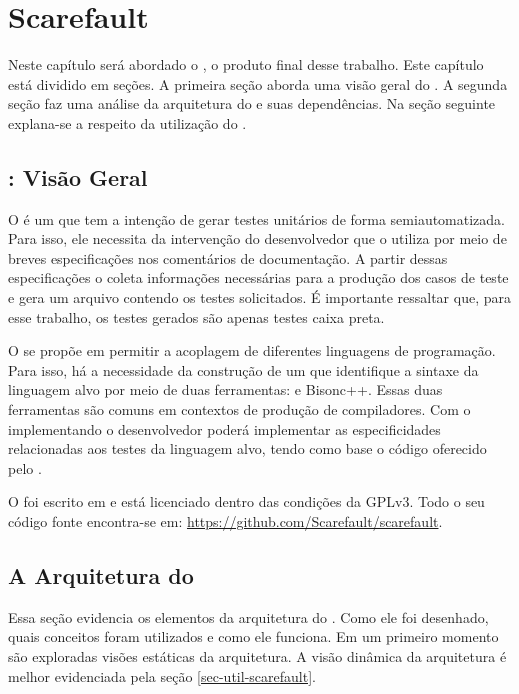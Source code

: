 \chapter[Scarefault]{Scarefault}
Neste capítulo será abordado o \Scarefault, o produto final desse
trabalho. Este capítulo está dividido em seções. A primeira seção aborda
uma visão geral do \Scarefault. A segunda seção faz uma análise da
arquitetura do \framework e suas dependências. Na seção seguinte explana-se
a respeito da utilização do \Scarefault.

\section{\Scarefault: Visão Geral}
O \scarefault é um \framework que tem a intenção de gerar testes unitários
de forma semiautomatizada. Para isso, ele necessita da intervenção do
desenvolvedor que o utiliza por meio de breves especificações nos
comentários de documentação. A partir dessas especificações o \scarefault
coleta informações necessárias para a produção dos casos de teste e gera
um arquivo contendo os testes solicitados. É importante ressaltar que,
para esse trabalho, os testes gerados são apenas testes caixa preta.

O \framework se propõe em permitir a acoplagem de diferentes linguagens
de programação. Para isso, há a necessidade da construção de um \parser
que identifique a sintaxe da linguagem alvo por meio de duas
ferramentas: \flexcpp e \textsf{Bisonc++}. Essas duas ferramentas são
comuns em contextos de produção de compiladores. Com o \parser
implementando o desenvolvedor poderá implementar as especificidades
relacionadas aos testes da linguagem alvo, tendo como base o código
oferecido pelo \Scarefault.

O \scarefault foi escrito em \cpp e está licenciado dentro das condições
da \textsf{GPLv3}. Todo o seu código fonte encontra-se em:
\url{https://github.com/Scarefault/scarefault}.

\section{A Arquitetura do \scarefault} \label{sec-arq-scarefault}
Essa seção evidencia os elementos da arquitetura do \Scarefault. Como
ele foi desenhado, quais conceitos foram utilizados e como ele funciona.
Em um primeiro momento são exploradas visões estáticas da arquitetura.
A visão dinâmica da arquitetura é melhor evidenciada pela seção \ref{sec-util-scarefault}.

